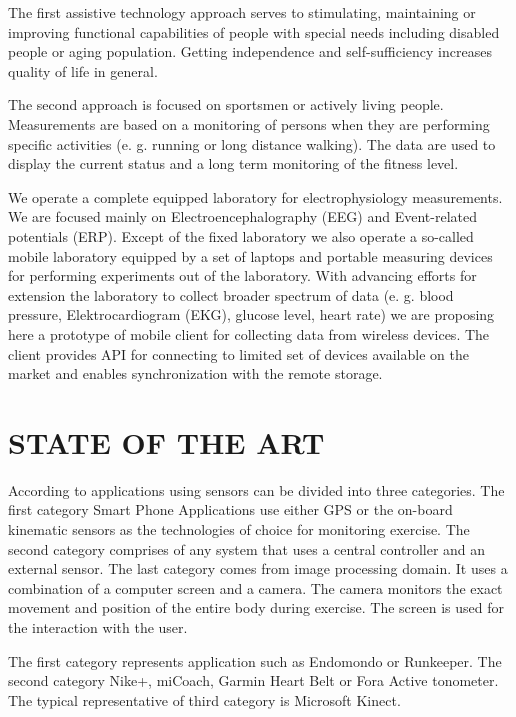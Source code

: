\documentclass[a4paper,twoside]{article}
\begin{document}
The first assistive technology approach serves to stimulating, maintaining or improving functional capabilities of people with special needs including disabled people or aging population. Getting independence and self-sufficiency increases quality of life in general. 

The second approach is focused on sportsmen or actively living people. Measurements are based on a monitoring of persons when they are performing specific activities (e. g. running or long distance walking). The data are used to display the current status and a long term monitoring of the fitness level. 

We operate a complete equipped laboratory \cite{10.3389/fninf.2014.00020} for electrophysiology measurements. We are focused  mainly on Electroencephalography (EEG) and Event-related potentials (ERP). Except of the fixed laboratory we also operate a so-called mobile laboratory equipped by a set of laptops and portable measuring devices for performing experiments out of the laboratory. With advancing efforts for extension the laboratory to collect broader spectrum of data (e. g. blood pressure, Elektrocardiogram (EKG), glucose level, heart rate) we are proposing here a prototype of mobile client for collecting data from wireless devices. The client provides API for connecting to limited set of devices available on the market and enables synchronization with the remote storage.

\section{\uppercase{state of the art}}
\label{sec:state-of-the-art}

\noindent
According to \cite{Lowe2012242} applications using sensors can be divided into three categories. The first category Smart Phone Applications use either GPS or the
on-board kinematic sensors as the technologies of choice for monitoring exercise. The second category comprises of any system that uses a central controller
and an external sensor. The last category comes from image processing domain. It uses a combination of a computer screen and a camera. The camera monitors the exact movement and position of the entire body during exercise. The screen is used for the interaction with the user.

The first category represents application such as Endomondo or Runkeeper. The second category Nike+, miCoach, Garmin Heart Belt or Fora Active tonometer. The typical representative of third category is Microsoft Kinect.
\end{document}
